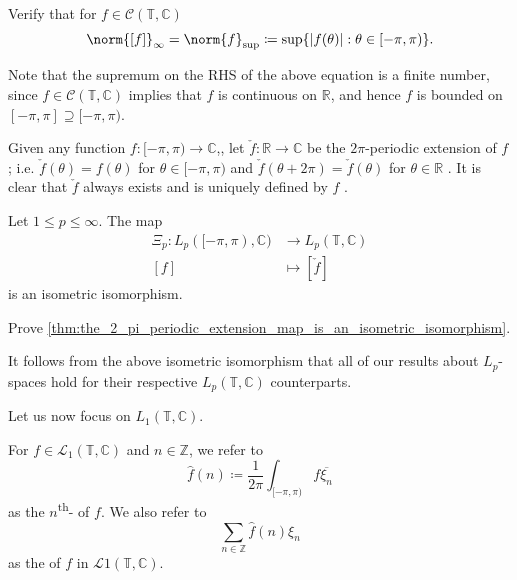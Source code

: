 \documentclass[notoc,notitlepage]{tufte-book}
\begin{document}
\begin{ex}
  Verify that for $f \in \mathcal{C}(\mathbb{T}, \mathbb{C})$
  \begin{equation*}
    \norm{[f]}_\infty = \norm{f}_{\sup}
    \coloneqq \sup \{ \abs{f(\theta)} : \theta \in [-\pi, \pi) \}.
  \end{equation*}
\end{ex}

\begin{note}
  Note that the supremum on the RHS of the above equation
  is a finite number, since $f \in \mathcal{C}(\mathbb{T}, \mathbb{C})$
  implies that $f$ is continuous on $\mathbb{R}$,
  and hence $f$ is bounded on $[-\pi, \pi] \supseteq [-\pi, \pi)$.
\end{note}

Given any function $f : [-\pi, \pi) \to \mathbb{C}$,,
let $\check{f} : \mathbb{R} \to \mathbb{C}$ be the $2 \pi$-periodic extension
of $f$; i.e. $\check{f}(\theta) = f(\theta)$ for $\theta \in [-\pi, \pi)$
and  $\check{f}(\theta + 2 \pi) = \check{f}(\theta)$  for $\theta \in \mathbb{R}$ .
It is clear that $\check{f}$  always exists
and is uniquely defined by $f$ .

\begin{thm}\label{thm:the_2_pi_periodic_extension_map_is_an_isometric_isomorphism}
  Let $1 \leq p \leq \infty$. The map
  \begin{align*}
    \Xi_p : L_p([-\pi, \pi), \mathbb{C}) &\to L_p(\mathbb{T}, \mathbb{C}) \\
        [f] &\mapsto [\check{f}]
  \end{align*}
  is an isometric isomorphism.
\end{thm}

\begin{ex}
  Prove \cref{thm:the_2_pi_periodic_extension_map_is_an_isometric_isomorphism}.
\end{ex}

It follows from the above isometric isomorphism that all of our results
about $L_p$-spaces hold for their respective
$L_p(\mathbb{T}, \mathbb{C})$ counterparts.

Let us now focus on $L_1(\mathbb{T}, \mathbb{C})$.

\begin{defn}\label{defn:fourier_coefficient_and_fourier_series}
  For $f \in \mathcal{L}_1(\mathbb{T}, \mathbb{C})$ and $n \in \mathbb{Z}$,
  we refer to
  \begin{equation*}
    \hat{f}(n) \coloneqq \frac{1}{2 \pi} \int_{[-\pi, \pi)} f \overline{\xi_n}
  \end{equation*}
  as the $n$\textsuperscript{th}- of $f$.
  We also refer to
  \begin{equation*}
    \sum_{n \in \mathbb{Z}} \hat{f}(n) \xi_n
  \end{equation*}
  as the  of $f$ in $\mathcal{L}1(\mathbb{T}, \mathbb{C})$.
\end{defn}
\end{document}

